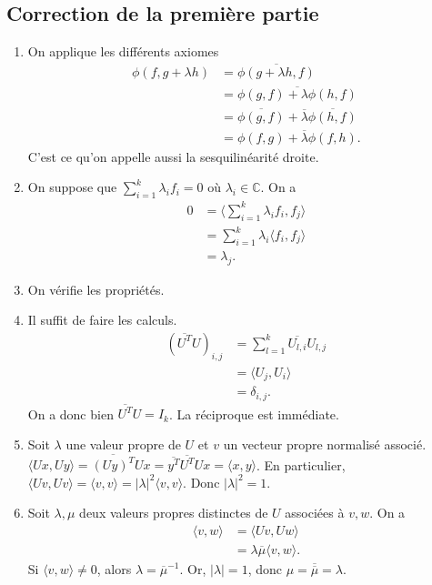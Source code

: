 \documentclass{article}[a4paper]
\newcommand{\C}{\mathbb{C}}
\newcommand{\braket}[2]{\langle #1,#2\rangle}
\begin{document}
\subsection*{Correction de la première partie}
\begin{enumerate}
    \item On applique les différents axiomes
    \begin{align*}
        \phi(f,g+\lambda h) &= \overline{\phi(g+\lambda h,f)}\\
        &= \overline{\phi(g,f)+\lambda\phi(h,f)}\\
        &= \overline{\phi(g,f)}+\overline{\lambda}\overline{\phi(h,f)}\\
        &= \phi(f,g) + \overline{\lambda}\phi(f,h).
    \end{align*}
    C'est ce qu'on appelle aussi la sesquilinéarité droite.
    \item On suppose que \(\sum_{i=1}^k \lambda_i f_i = 0\) où \(\lambda_i\in \C\).
    On a 
    \begin{align*}
        0 &= \braket{\sum_{i=1}^k \lambda_i f_i}{f_j}\\
        &= \sum_{i=1}^k \lambda_i \braket{f_i}{f_j}\\
        &= \lambda_j.
    \end{align*}
    \item On vérifie les propriétés.
    \item Il suffit de faire les calculs. 
    \begin{align*}
        (\overline{U^T}U)_{i,j} & = \sum_{l=1}^k \overline{U_{l,i}}U_{l,j}\\
        & = \braket{U_j}{U_i}\\
        & = \delta_{i,j}.
    \end{align*}
    On a donc bien \(\overline{U^T}U = I_k\). La réciproque est immédiate.
    \item Soit \(\lambda\) une valeur propre de \(U\) et \(v\) un vecteur propre normalisé associé. \(\braket{Ux}{Uy} = \overline{(Uy)^T}Ux = \overline{y^T}\overline{U^T}Ux = \braket{x}{y}\).
    En particulier, \(\braket{Uv}{Uv} = \braket{v}{v} = \lvert\lambda\rvert^2 \braket{v}{v}\). Donc \(\lvert\lambda\rvert^2 = 1\).
    \item Soit \(\lambda,\mu\) deux valeurs propres distinctes de \(U\) associées à \(v,w\).
    On a 
    \begin{align*}
        \braket{v}{w} &= \braket{Uv}{Uw}\\
        &= \lambda\overline{\mu}\braket{v}{w}.
    \end{align*}
    Si \(\braket{v}{w} \neq 0\), alors \(\lambda = \overline{\mu}^{-1}\). 
    Or, \(\lvert\lambda\rvert = 1\), donc \(\mu = \overline{\overline{\mu}} = \lambda\).
\end{enumerate}
\end{document}

